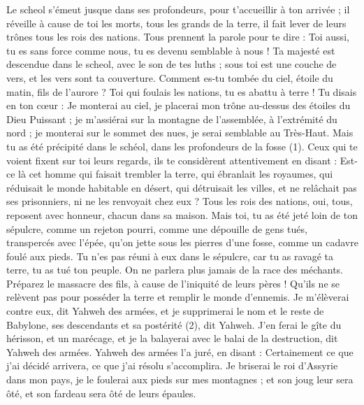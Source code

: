 \begin{multicols}{2}
{
Le scheol s’émeut jusque dans ses profondeurs, pour t’accueillir à ton arrivée ; il réveille à cause de toi les morts, tous les grands de la terre, il fait lever de leurs trônes tous les rois des nations.
Tous prennent la parole pour te dire : Toi aussi, tu es sans force comme nous, tu es devenu semblable à nous !
Ta majesté est descendue dans le scheol, avec le son de tes luths ; sous toi est une couche de vers, et les vers sont ta couverture.
Comment es-tu tombée du ciel, étoile du matin, fils de l’aurore ? Toi qui foulais les nations, tu es abattu à terre !
Tu disais en ton cœur : Je monterai au ciel, je placerai mon trône au-dessus des étoiles du Dieu Puissant ; je m’assiérai sur la montagne de l’assemblée, à l’extrémité du nord ;
je monterai sur le sommet des nues, je serai semblable au Très-Haut.
Mais tu as été précipité dans le schéol, dans les profondeurs de la fosse (1).
Ceux qui te voient fixent sur toi leurs regards, ils te considèrent attentivement en disant : Est-ce là cet homme qui faisait trembler la terre, qui ébranlait les royaumes,
qui réduisait le monde habitable en désert, qui détruisait les villes, et ne relâchait pas ses prisonniers, ni ne les renvoyait chez eux ?
Tous les rois des nations, oui, tous, reposent avec honneur, chacun dans sa maison.
Mais toi, tu as été jeté loin de ton sépulcre, comme un rejeton pourri, comme une dépouille de gens tués, transpercés avec l'épée, qu’on jette sous les pierres d’une fosse, comme un cadavre foulé aux pieds.
Tu n’es pas réuni à eux dans le sépulcre, car tu as ravagé ta terre, tu as tué ton peuple. On ne parlera plus jamais de la race des méchants.
Préparez le massacre des fils, à cause de l'iniquité de leurs pères ! Qu’ils ne se relèvent pas pour posséder la terre et remplir le monde d’ennemis.
Je m'élèverai contre eux, dit Yahweh des armées, et je supprimerai le nom et le reste de Babylone, ses descendants et sa postérité (2), dit Yahweh.
J’en ferai le gîte du hérisson, et un marécage, et je la balayerai avec le balai de la destruction, dit Yahweh des armées.
Yahweh des armées l’a juré, en disant : Certainement ce que j’ai décidé arrivera, ce que j’ai résolu s’accomplira.
Je briserai le roi d'Assyrie dans mon pays, je le foulerai aux pieds sur mes montagnes ; et son joug leur sera ôté, et son fardeau sera ôté de leurs épaules.
}
\end{multicols}
